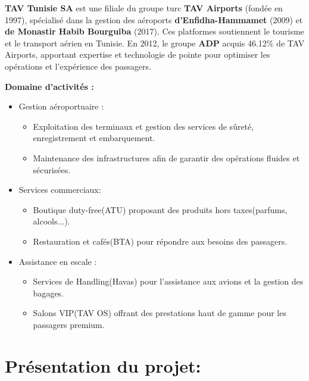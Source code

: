 \documentclass[a4paper,11pt]{report}
\begin{document}
\textbf{TAV Tunisie SA} est une filiale du groupe turc\textbf{ TAV Airports} (fondée en 1997), spécialisé dans la gestion des aéroports \textbf{d'Enfidha-Hammamet} (2009) et \textbf{de Monastir Habib Bourguiba} (2017).
Ces platformes soutiennent le tourisme et le transport aérien en Tunisie.
En 2012, le groupe \textbf{ADP} acquis 46.12\% de TAV Airports, apportant expertise et technologie de pointe pour optimiser les opérations et l'expérience des passagers.

\textbf{Domaine d'activités :} 

\begin{itemize}
\item Gestion aéroportuaire :
	\begin{itemize}
	\item Exploitation des terminaux et gestion des services de sûreté, enregistrement et embarquement.
	\item Maintenance des infrastructures afin de garantir des opérations fluides et sécurisées.
	\end{itemize}
	
\item Services commerciaux:
	\begin{itemize}
		\item Boutique duty-free(ATU) proposant des produits hors taxes(parfums, alcools...).
		\item Restauration et cafés(BTA) pour répondre aux besoins des passagers.
	\end{itemize}

	\item Assistance en escale :
	\begin{itemize}
	\item Services de Handling(Havas) pour l'assistance aux avions et la gestion des bagages.
	\item Salons VIP(TAV OS) offrant des prestations haut de gamme pour les passagers premium.
	\end{itemize}
\end{itemize}



\newpage
\section{Présentation du projet: }
\end{document}
